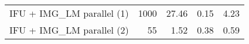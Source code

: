 \begin{table}
\begin{tabular}{|l|r|r|c|c|}
    IFU + IMG\_LM parallel (1)                    & 1000                                    & 27.46                                     & 0.15                                         & 4.23                                      \\
    IFU + IMG\_LM parallel (2)                    & 55                                      & 1.52                                      & 0.38                                         & 0.59                                      \\
    \hline
  \end{tabular}
\end{table}



